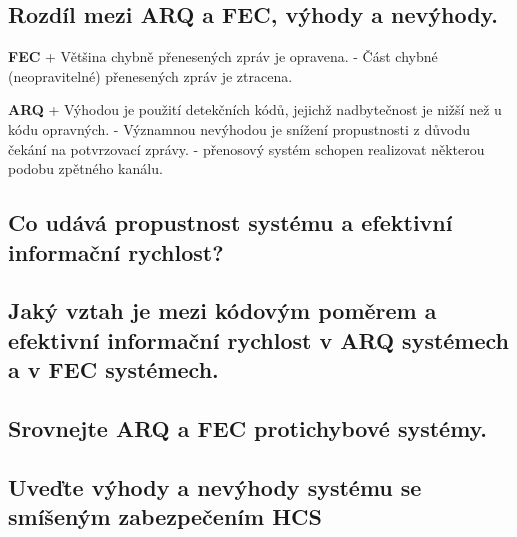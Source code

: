 \subsection{Rozdíl mezi ARQ a FEC, výhody a nevýhody.}
\textbf{FEC} + Většina chybně přenesených zpráv je opravena. - Část chybné (neopravitelné) přenesených zpráv je ztracena. 

\textbf{ARQ} + Výhodou je použití detekčních kódů, jejichž nadbytečnost je nižší než u kódu opravných. - Významnou nevýhodou je snížení propustnosti z důvodu čekání na potvrzovací zprávy. - přenosový systém schopen realizovat některou podobu zpětného kanálu.

\subsection{Co udává propustnost systému a efektivní informační rychlost?}

\subsection{Jaký vztah je mezi kódovým poměrem a efektivní informační rychlost v ARQ systémech a
v FEC systémech.}

\subsection{Srovnejte ARQ a FEC protichybové systémy.}

\subsection{Uveďte výhody a nevýhody systému se smíšeným zabezpečením HCS}